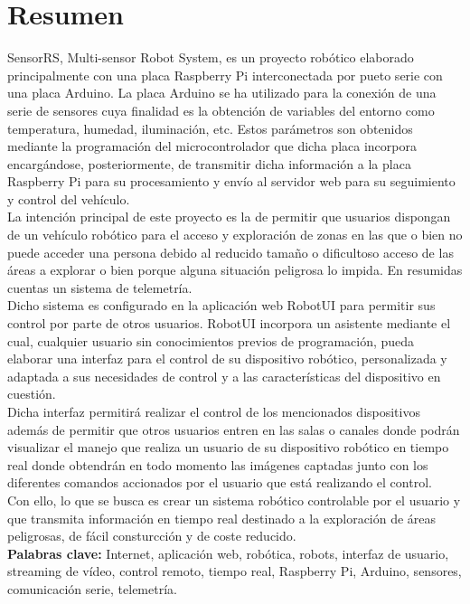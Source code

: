

\section*{Resumen}
\label{resumen}

SensorRS, Multi-sensor Robot System, es un proyecto robótico elaborado principalmente con una placa Raspberry Pi interconectada por pueto serie con una placa Arduino. La placa Arduino
se ha utilizado para la conexión de una serie de sensores cuya finalidad es la obtención de variables del entorno como temperatura, humedad, iluminación, etc. Estos parámetros 
son obtenidos mediante la programación del microcontrolador que dicha placa incorpora encargándose, posteriormente, de transmitir dicha información a la placa Raspberry Pi
para su procesamiento y envío al servidor web para su seguimiento y control del vehículo.\\

La intención principal de este proyecto es la de permitir que usuarios dispongan de un vehículo robótico para el acceso y exploración de 
zonas en las que o bien no puede acceder una persona debido al reducido tamaño o dificultoso acceso de las áreas a explorar o 
bien porque alguna situación peligrosa lo impida. En resumidas cuentas un sistema de telemetría.\\

Dicho sistema es configurado en la aplicación web RobotUI para permitir sus control por parte de otros usuarios. RobotUI incorpora un asistente mediante el cual, cualquier usuario 
sin conocimientos previos de programación, pueda elaborar una interfaz para el control de su dispositivo robótico, personalizada y adaptada a sus necesidades de control 
y a las características del dispositivo en cuestión.\\

Dicha interfaz permitirá realizar el control de los mencionados dispositivos además de permitir que otros usuarios entren en las salas o canales donde podrán visualizar el manejo 
que realiza un usuario de su dispositivo robótico en tiempo real donde obtendrán en todo momento las imágenes captadas junto con los diferentes comandos accionados por el usuario 
que está realizando el control.\\

Con ello, lo que se busca es crear un sistema robótico controlable por el usuario y que transmita información en tiempo real destinado a la exploración de áreas peligrosas, 
de fácil consturcción y de coste reducido.\\

\textbf{Palabras clave:} Internet, aplicación web, robótica, robots, interfaz de usuario, streaming de vídeo, control remoto, tiempo real, Raspberry Pi, Arduino, sensores, comunicación serie,
telemetría.\\
